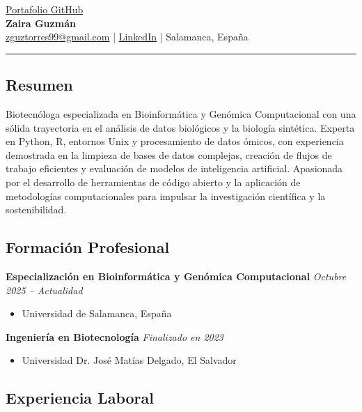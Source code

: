\documentclass[a4paper,10pt]{article}
\begin{document}
\pagestyle{empty}

\begin{center}
  \href{https://github.com/zguztorres/Bioinformatics-Portfolio}{Portafolio GitHub} \\[0.5em]
  {\LARGE \bfseries Zaira Guzmán} \\[0.5em]
  \href{mailto:zguztorres99@gmail.com}{zguztorres99@gmail.com} \quad | \quad \href{https://www.linkedin.com/in/zaira-guzman/}{LinkedIn} \quad | \quad Salamanca, España
\end{center}

\hrule
\vspace{4pt}

\subsection*{Resumen}
Biotecnóloga especializada en Bioinformática y Genómica Computacional con una sólida trayectoria en el análisis de datos biológicos y la biología sintética. Experta en Python, R, entornos Unix y procesamiento de datos ómicos, con experiencia demostrada en la limpieza de bases de datos complejas, creación de flujos de trabajo eficientes y evaluación de modelos de inteligencia artificial. Apasionada por el desarrollo de herramientas de código abierto y la aplicación de metodologías computacionales para impulsar la investigación científica y la sostenibilidad.

\subsection*{Formación Profesional}

\textbf{Especialización en Bioinformática y Genómica Computacional} \hfill \textit{Octubre 2025 – Actualidad}
\begin{itemize}
    \item Universidad de Salamanca, España
\end{itemize}

\textbf{Ingeniería en Biotecnología} \hfill \textit{Finalizado en 2023}
\begin{itemize}
    \item Universidad Dr. José Matías Delgado, El Salvador
\end{itemize}


\subsection*{Experiencia Laboral}
\end{document}
